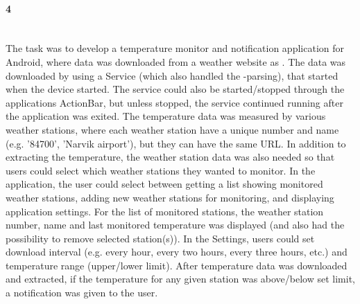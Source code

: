 \paragraph{ 4} ~\\
The task was to develop a temperature monitor and notification application for Android, where data was downloaded from a weather website as . 
The data was downloaded by using a Service (which also handled the -parsing), that started when the device started.
The service could also be started/stopped through the applications ActionBar, but unless stopped, the service continued running after the application was exited.
The temperature data was measured by various weather stations, where each weather station have a unique number and name (e.g. '84700', 'Narvik airport'), but they can have the same URL. 
In addition to extracting the temperature, the weather station data was also needed so that users could select which weather stations they wanted to monitor.
\vspace{0.5em}\newline
In the application, the user could select between getting a list showing monitored weather stations, adding new weather stations for monitoring, and displaying application settings. 
For the list of monitored stations, the weather station number, name and last monitored temperature was displayed (and also had the possibility to remove selected station(s)).
In the Settings, users could set download interval (e.g. every hour, every two hours, every three hours, etc.) and temperature range (upper/lower limit).
After temperature data was downloaded and extracted, if the temperature for any given station was above/below set limit, a notification was given to the user.

